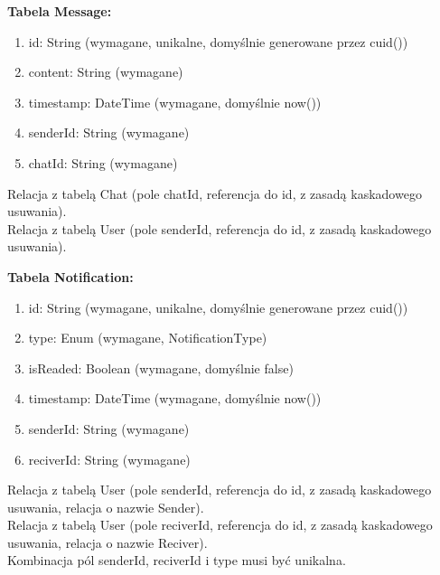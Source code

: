 \documentclass[12pt]{article}
\begin{document}
\noindent\hspace{0.6cm}\textbf{\large Tabela Message:}\vspace{-10pt}
\begin{enumerate}[label=\textbullet, leftmargin=1.2cm, itemsep=-6pt]
	\item id: String (wymagane, unikalne, domyślnie generowane przez cuid())
	\item content: String (wymagane)
	\item timestamp: DateTime (wymagane, domyślnie now())
	\item senderId: String (wymagane)
	\item chatId: String (wymagane)
\end{enumerate}
\vspace{-10pt}
\begin{adjustwidth}{0.5cm}{0pt}
	Relacja z tabelą Chat (pole chatId, referencja do id, z zasadą kaskadowego usuwania).\\
	Relacja z tabelą User (pole senderId, referencja do id, z zasadą kaskadowego usuwania).
\end{adjustwidth}
\vspace{10pt}

\noindent\hspace{0.6cm}\textbf{\large Tabela Notification:}\vspace{-10pt}
\begin{enumerate}[label=\textbullet, leftmargin=1.2cm, itemsep=-6pt]
	\item id: String (wymagane, unikalne, domyślnie generowane przez cuid())
	\item type: Enum (wymagane, NotificationType)
	\item isReaded: Boolean (wymagane, domyślnie false)
	\item timestamp: DateTime (wymagane, domyślnie now())
	\item senderId: String (wymagane)
	\item reciverId: String (wymagane)
\end{enumerate}
\vspace{-10pt}
\begin{adjustwidth}{0.5cm}{0pt}
	Relacja z tabelą User (pole senderId, referencja do id, z zasadą kaskadowego usuwania, relacja o nazwie Sender).\\
	Relacja z tabelą User (pole reciverId, referencja do id, z zasadą kaskadowego usuwania, relacja o nazwie Reciver).\\
	Kombinacja pól senderId, reciverId i type musi być unikalna.
\end{adjustwidth}
\vspace{10pt}
\end{document}
